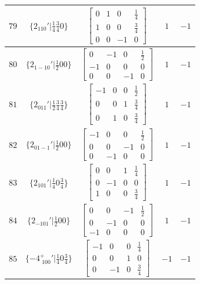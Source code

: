 \documentclass[fleqn,8pt]{jsarticle}
\begin{document}
\begin{longtable}{ccccc}
$ 79 $ & $ \{2{}_{110}{}'|\frac{1}{4} \frac{3}{4} 0\} $ & $ \begin{bmatrix} 0 & 1 & 0 & \frac{1}{4} \\ 1 & 0 & 0 & \frac{3}{4} \\ 0 & 0 & -1 & 0 \end{bmatrix} $ & $ 1 $ & $ -1 $ \\ \hline
$ 80 $ & $ \{2{}_{1-10}{}'|\frac{1}{2} 0 0\} $ & $ \begin{bmatrix} 0 & -1 & 0 & \frac{1}{2} \\ -1 & 0 & 0 & 0 \\ 0 & 0 & -1 & 0 \end{bmatrix} $ & $ 1 $ & $ -1 $ \\ \hline
$ 81 $ & $ \{2{}_{011}{}'|\frac{1}{2} \frac{3}{4} \frac{3}{4}\} $ & $ \begin{bmatrix} -1 & 0 & 0 & \frac{1}{2} \\ 0 & 0 & 1 & \frac{3}{4} \\ 0 & 1 & 0 & \frac{3}{4} \end{bmatrix} $ & $ 1 $ & $ -1 $ \\ \hline
$ 82 $ & $ \{2{}_{01-1}{}'|\frac{1}{2} 0 0\} $ & $ \begin{bmatrix} -1 & 0 & 0 & \frac{1}{2} \\ 0 & 0 & -1 & 0 \\ 0 & -1 & 0 & 0 \end{bmatrix} $ & $ 1 $ & $ -1 $ \\ \hline
$ 83 $ & $ \{2{}_{101}{}'|\frac{1}{4} 0 \frac{3}{4}\} $ & $ \begin{bmatrix} 0 & 0 & 1 & \frac{1}{4} \\ 0 & -1 & 0 & 0 \\ 1 & 0 & 0 & \frac{3}{4} \end{bmatrix} $ & $ 1 $ & $ -1 $ \\ \hline
$ 84 $ & $ \{2{}_{-101}{}'|\frac{1}{2} 0 0\} $ & $ \begin{bmatrix} 0 & 0 & -1 & \frac{1}{2} \\ 0 & -1 & 0 & 0 \\ -1 & 0 & 0 & 0 \end{bmatrix} $ & $ 1 $ & $ -1 $ \\ \hline
$ 85 $ & $ \{-4^{+}_{\,\,100}{}'|\frac{1}{4} 0 \frac{3}{4}\} $ & $ \begin{bmatrix} -1 & 0 & 0 & \frac{1}{4} \\ 0 & 0 & 1 & 0 \\ 0 & -1 & 0 & \frac{3}{4} \end{bmatrix} $ & $ -1 $ & $ -1 $ \\ \hline

\end{longtable}
\end{document}

